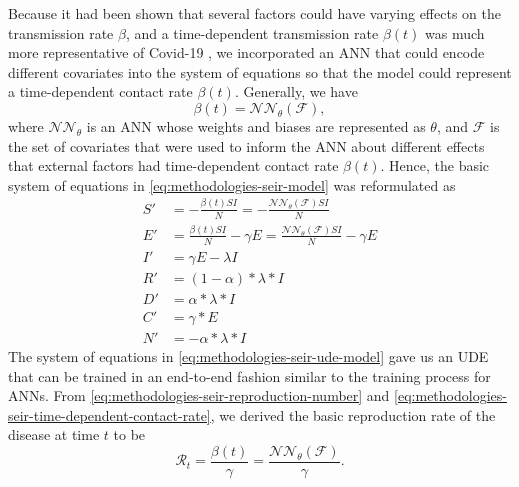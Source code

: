 Because it had been shown that several factors could have varying effects on the transmission rate $\beta$, and a time-dependent transmission rate $\beta(t)$ was much more representative of Covid-19 \cite{arikInterpretableSequenceLearning, changMobilityNetworkModels2021, dandekarMachineLearningAidedGlobal2020a, ihmecovid-19forecastingteamModelingCOVID19Scenarios2021, liSubstantialUndocumentedInfection2020}, we incorporated an \gls{ANN} that could encode different covariates into the system of equations so that the model could represent a time-dependent contact rate $\beta(t)$.
Generally, we have
\begin{equation}
    \beta(t) = \mathcal{NN}_\theta (\mathcal{F}),
    \label{eq:methodologies-seir-time-dependent-contact-rate}
\end{equation}
where $\mathcal{NN}_\theta$ is an \gls{ANN} whose weights and biases are represented as $\theta$, and $\mathcal{F}$ is the set of covariates that were used to inform the \gls{ANN} about different effects that external factors had time-dependent contact rate $\beta(t)$.
Hence, the basic system of equations in \autoref{eq:methodologies-seir-model} was reformulated as
\begin{equation}
    \begin{aligned}
        S' &= - \frac{\beta(t) SI}{N} = -\frac{\mathcal{NN}_\theta(\mathcal{F}) SI}{N} \\
        E' &= \frac{\beta(t) SI}{N} - \gamma E = \frac{\mathcal{NN}_\theta(\mathcal{F}) SI}{N} - \gamma E \\
        I' &= \gamma E - \lambda I \\
        R' &= (1 - \alpha) * \lambda * I \\
        D' &= \alpha * \lambda * I \\
        C' &= \gamma * E \\
        N' &= - \alpha * \lambda * I
    \end{aligned}
    \label{eq:methodologies-seir-ude-model}
\end{equation}
The system of equations in \autoref{eq:methodologies-seir-ude-model} gave us an \gls{UDE} \cite{rackauckasUniversalDifferentialEquations2020} that can be trained in an end-to-end fashion similar to the training process for \glspl{ANN}.
From \autoref{eq:methodologies-seir-reproduction-number} and \autoref{eq:methodologies-seir-time-dependent-contact-rate}, we derived the basic reproduction rate of the disease at time $t$ to be
\begin{equation*}
    \mathcal{R}_t = \frac{\beta(t)}{\gamma} = \frac{\mathcal{NN}_\theta(\mathcal{F})}{\gamma}.
\end{equation*}


